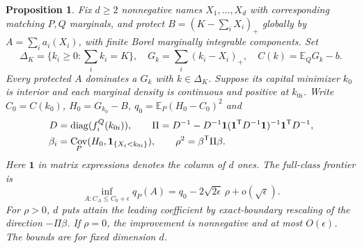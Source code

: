 \documentclass[11pt,a4paper]{amsart}
\theoremstyle{plain}
\newtheorem{proposition}[theorem]{Proposition}
\theoremstyle{definition}
\theoremstyle{remark}
\DeclareMathOperator{\Cov}{Cov}
\newcommand{\EE}{\mathbb{E}}
\newcommand{\one}{\mathbf{1}}
\begin{document}
\begin{proposition}\label{prop:manynames}
Fix $d\ge2$ nonnegative names $X_1,\ldots,X_d$ with corresponding matching $P,Q$ marginals, and protect
$B=(K-\sum_iX_i)_+$ globally by $A=\sum_i a_i(X_i)$, with finite Borel marginally integrable components. Set
\[
 \Delta_K=\{k_i\ge0:\sum_i k_i=K\},\quad
 G_k=\sum_i(k_i-X_i)_+,\quad C(k)=\EE_QG_k-b.
\]
Every protected $A$ dominates a $G_k$ with $k\in\Delta_K$. Suppose its capital minimizer $k_0$ is interior and each marginal density is continuous and positive at $k_{0i}$. Write $C_0=C(k_0)$, $H_0=G_{k_0}-B$, $q_0=\EE_P(H_0-C_0)^2$ and
\begin{align}\label{eq:manymatrix}
 D&=\operatorname{diag}(f_i^Q(k_{0i})),\qquad
 \Pi=D^{-1}-D^{-1}\one(\one^{\mathsf T}D^{-1}\one)^{-1}\one^{\mathsf T}D^{-1},\notag\\
 \beta_i&=\Cov_P(H_0,\one_{\{X_i<k_{0i}\}}),\qquad
 \rho^2=\beta^{\mathsf T}\Pi\beta.
\end{align}
Here $\one$ in matrix expressions denotes the column of $d$ ones. The full-class frontier is
\begin{equation}\label{eq:manyfrontier}
 \inf_{A:C_A\le C_0+\epsilon}q_P(A)
 =q_0-2\sqrt{2\epsilon}\,\rho+o(\sqrt\epsilon).
\end{equation}
For $\rho>0$, $d$ puts attain the leading coefficient by exact-boundary rescaling of the direction $-\Pi\beta$. If $\rho=0$, the improvement is nonnegative and at most $O(\epsilon)$. The bounds are for fixed dimension $d$.
\end{proposition}
\end{document}
